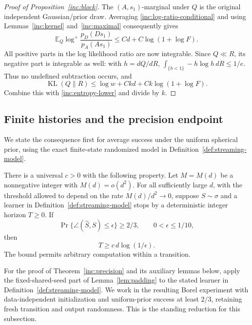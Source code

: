 \begin{proof}[Proof of Proposition~\ref{inc:block}]
The \((A,s_1)\)-marginal under \(Q\) is the original independent
Gaussian/prior draw.  Averaging \eqref{inc:log-ratio-conditional} and
using Lemmas~\ref{inc:kernel} and~\ref{inc:maximal} consequently gives
\begin{equation}\label{inc:log-ratio}
 \mathbb E_Q\log^+\frac{p_D(Ds_1)}{p_A(As_1)}
 \le Cd+C\log(1+\log F).
\end{equation}
All positive parts in the log likelihood ratio are now integrable.
Since \(Q\ll R\), its negative part is integrable as well: with
\(h=dQ/dR\),
\(\int_{\{h<1\}}-h\log h\,dR\le1/e\).
Thus no undefined subtraction occurs, and
\[
 \operatorname{KL}(Q\|R)
 \le\log w+Ckd+Ck\log(1+\log F).
\]
Combine this with \eqref{inc:entropy-lower} and divide by \(k\).
\end{proof}

\subsection{Finite histories and the precision endpoint}
\label{inc:history-section}

We state the consequence first for average success under the uniform
spherical prior, using the exact finite-state randomized model in
Definition~\ref{def:streaming-model}.

\begin{theorem}\label{inc:precision}
There is a universal \(c>0\) with the following property.  Let
\(M=M(d)\) be a nonnegative integer with \(M(d)=o(d^2)\).
For all sufficiently large \(d\), with the
threshold allowed to depend on the rate \(M(d)/d^2\to0\), suppose
\(S\sim\sigma\) and a learner in Definition~\ref{def:streaming-model} stops by a
deterministic integer horizon \(T\ge0\).  If
\[
 \Pr\{\angle(\widehat S,S)\le\epsilon\}\ge2/3,
 \qquad 0<\epsilon\le1/10,
\]
then
\begin{equation}\label{inc:precision-bound}
 T\ge c\,d\log(1/\epsilon).
\end{equation}
The bound permits arbitrary computation within a transition.
\end{theorem}

For the proof of Theorem~\ref{inc:precision} and its auxiliary lemmas
below, apply the fixed-shared-seed part of Lemma~\ref{lem:padding} to the
stated learner in Definition~\ref{def:streaming-model}.  We work in the
resulting Borel experiment with data-independent initialization and
uniform-prior success at least \(2/3\), retaining fresh transition and
output randomness.  This is the standing reduction for this subsection.

